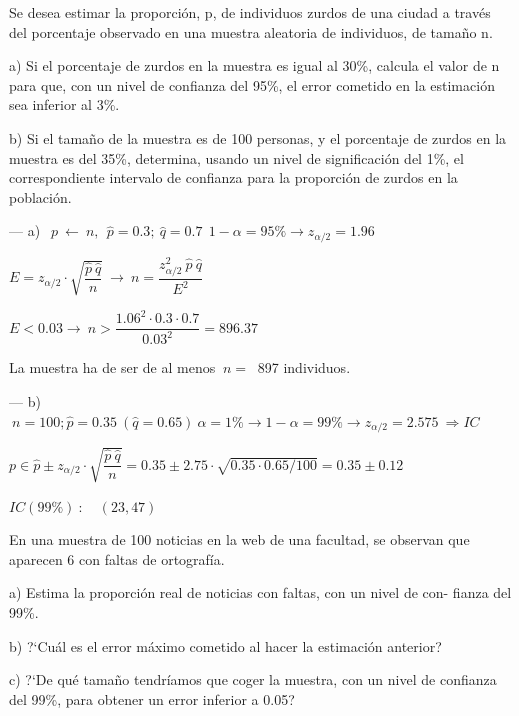 \vspace{5mm} %
\begin{ejemplo}
\begin{ejer}
	
Se desea estimar la proporción, p, de individuos zurdos de una ciudad a través del porcentaje observado en una muestra aleatoria de individuos, de tamaño n.
 
a) Si el porcentaje de zurdos en la muestra es igual al 30\%, calcula el valor de n para que, con un nivel de confianza del 95\%, el error cometido en la estimación sea inferior al 3\%. 

b) Si el tamaño de la muestra es de 100 personas, y el porcentaje de zurdos en la muestra es del 35\%, determina, usando un nivel de significación del 1\%, el correspondiente intervalo de confianza para la proporción de zurdos en la población. 
\end{ejer}	
\end{ejemplo}

\vspace{2mm} --- a) $\ \ p \ \leftarrow \ n,\ \ \hat p=0.3;\ \hat q=0.7\ \ 1-\alpha=95\% \to z_{\alpha/2}=1.96 $

\vspace{2mm} $E=z_{\alpha/2}\cdot \sqrt{\dfrac{\hat p \ \hat q}{n}} \ \to \  n=\dfrac{z_{\alpha/2}^2\ \hat p \ \hat q}{E^2}$

\vspace{2mm} $E<0.03 \to \ n>\dfrac{1.06^2\cdot 0.3\cdot 0.7}{0.03^2}=896.37$

\vspace{2mm} La muestra ha de ser de al menos $\ n = \ $ 897 individuos.

\vspace{2mm} --- b) $\ n=100; \hat p =0.35 \ (\hat q =0.65)\ \alpha=1\% \to 1-\alpha=99\% \to z_{\alpha/2}=2.575 \ \Rightarrow IC$

\vspace{2mm} $p\in \hat p \pm z_{\alpha/2}\cdot \sqrt{\dfrac{\hat p \ \hat q}{n}} = 0.35 \pm 2.75 \cdot \sqrt{0.35\cdot 0.65/100}=0.35 \pm  0.12$

\vspace{2mm} $IC(99\%)\ : \quad  (23,47)$



\vspace{5mm} %
\begin{ejemplo}
\begin{ejer}
	En una muestra de 100 noticias en la web de una facultad, se observan que aparecen 6 con faltas de ortografía. 

a) Estima la proporción real de noticias con faltas, con un nivel de con- fianza del 99\%. 

b) ?`Cuál es el error máximo cometido al hacer la estimación anterior? 

c) ?`De qué tamaño tendríamos que coger la muestra, con un nivel de confianza del 99\%, para obtener un error inferior a 0.05? 
\end{ejer}	
\end{ejemplo}

